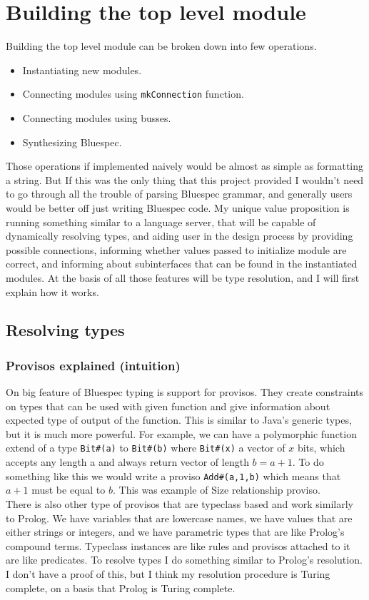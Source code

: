 \documentclass[14pt]{report}
\begin{document}
\section{Building the top level module}
Building the top level module can be broken down into few operations.
\begin{itemize}
    \item Instantiating new modules.
    \item Connecting modules using \verb!mkConnection! function.
    \item Connecting modules using busses.
    \item Synthesizing Bluespec.
\end{itemize} 
Those operations if implemented naively would be almost as simple as formatting a string. But If this was the only thing that this project provided I wouldn't need to go through all the trouble of parsing Bluespec grammar, and generally users would be better off just writing Bluespec code. My unique value proposition is running something similar to a language server, that will be capable of dynamically resolving types, and aiding user in the design process by providing possible connections, informing whether values passed to initialize module are correct, and informing about subinterfaces that can be found in the instantiated modules. 
At the basis of all those features will be type resolution, and I will first explain how it works.
\subsection{Resolving types}
\subsubsection{Provisos explained (intuition)}
On big feature of Bluespec typing is support for provisos. They create constraints on types that can be used with given function and give information about expected type of output of the function. This is similar to Java's generic types, but it is much more powerful. For example, we can have a polymorphic function extend of a type \verb!Bit#(a)! to \verb!Bit#(b)! where \verb!Bit#(x)! a vector of $x$ bits, which accepts any length a and always return vector of length $b=a+1$. To do something like this we would write a proviso \verb!Add#(a,1,b)! which means that $a+1$ must be equal to $b$. This was example of Size relationship proviso.
\\
There is also other type of provisos that are typeclass based and work similarly to Prolog. We have variables that are lowercase names, we have values that are either strings or integers, and we have parametric types that are like Prolog's compound terms. Typeclass instances are like rules and provisos attached to it are like predicates. To resolve types I do something similar to Prolog's resolution. I don't have a proof of this, but I think my resolution procedure is Turing complete, on a basis that Prolog is Turing complete.
\end{document}
